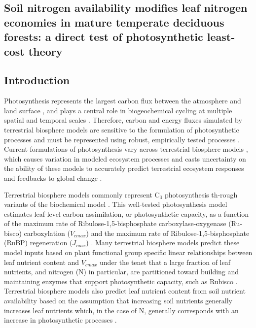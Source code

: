 \begin{singlespace}
    \chapter{\textbf{Soil nitrogen availability modifies leaf nitrogen economies in mature temperate deciduous forests: a direct test of photosynthetic least-cost theory}}
\end{singlespace}
    
\section{Introduction}
Photosynthesis represents the largest carbon flux between the atmosphere and land surface , and plays a central role in biogeochemical cycling at multiple spatial and temporal scales . Therefore, carbon and energy fluxes simulated by terrestrial biosphere models are sensitive to the formulation of photosynthetic processes  and must be represented using robust, empirically tested processes . Current formulations of photosynthesis vary across terrestrial biosphere models , which causes variation in modeled ecosystem processes  and casts uncertainty on the ability of these models to accurately predict terrestrial ecosystem responses and feedbacks to global change .

Terrestrial biosphere models commonly represent C$_{3}$ photosynthesis th-rough variants of the  biochemical model . This well-tested photosynthesis model estimates leaf-level carbon assimilation, or photosynthetic capacity, as a function of the maximum rate of Ribulose-1,5-bisphosphate carboxylase-oxygenase (Ru-bisco) carboxylation ($V_{cmax}$) and the maximum rate of Ribulose-1,5-bisphosphate (RuBP) regeneration ($J_{max}$) . Many terrestrial biosphere models predict these model inputs based on plant functional group specific linear relationships between leaf nutrient content and $V_{cmax}$  under the tenet that a large fraction of leaf nutrients, and nitrogen (N) in particular, are partitioned toward building and maintaining enzymes that support photosynthetic capacity, such as Rubisco . Terrestrial biosphere models also predict leaf nutrient content from soil nutrient availability based on the assumption that increasing soil nutrients generally increases leaf nutrients  which, in the case of N, generally corresponds with an increase in photosynthetic processes .

